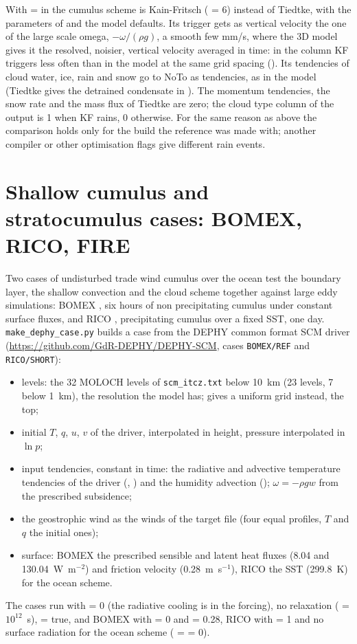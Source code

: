 With  =  in  the
cumulus scheme is Kain-Fritsch ( = 6) instead of Tiedtke, with the parameters
of  and the model defaults. Its trigger gets as
vertical velocity the one of the large scale omega, $-\omega/(\rho g)$,
a smooth few mm/s, where the 3D model gives it the resolved, noisier,
vertical velocity averaged in time: in the column KF triggers less
often than in the model at the same grid spacing (). Its
tendencies of cloud water, ice, rain and snow go to NoTo as tendencies,
as in the model (Tiedtke gives the detrained condensate in
). The momentum tendencies, the snow rate and the mass flux
of Tiedtke are zero; the cloud type column of the output is 1 when KF
rains, 0 otherwise. For the same reason as above
the comparison holds only for the build the reference was made with;
another compiler or other optimisation flags give different rain events.

\section{Shallow cumulus and stratocumulus cases: BOMEX, RICO, FIRE}

Two cases of undisturbed trade wind cumulus over the ocean test the
boundary layer, the shallow convection and the cloud scheme together
against large eddy simulations: BOMEX \citep{siebesma2003}, six hours of
non precipitating cumulus under constant surface fluxes, and RICO
\citep{vanzanten2011}, precipitating cumulus over a fixed SST, one day.
\verb=make_dephy_case.py= builds a case from the DEPHY common format SCM
driver (\url{https://github.com/GdR-DEPHY/DEPHY-SCM}, cases
\verb=BOMEX/REF= and \verb=RICO/SHORT=):
\begin{itemize}
  \item levels: the 32 MOLOCH levels of \verb=scm_itcz.txt= below
        10~km (23 levels, 7 below 1~km), the resolution the model has;
         gives a uniform grid instead,  the top;
  \item initial $T$, $q$, $u$, $v$ of the driver, interpolated in height,
        pressure interpolated in $\ln p$;
  \item input tendencies, constant in time: the radiative and advective
        temperature tendencies of the driver (,
        ) and the humidity advection
        (); $\omega = -\rho g w$ from the prescribed
        subsidence;
  \item the geostrophic wind as the winds of the target file (four equal
        profiles, $T$ and $q$ the initial ones);
  \item surface: BOMEX the prescribed sensible and latent heat fluxes
        (8.04 and 130.04~W~m$^{-2}$) and friction velocity (0.28~m~s$^{-1}$),
        RICO the SST (299.8~K) for the ocean scheme.
\end{itemize}
The cases run with  = 0 (the radiative cooling is in the
forcing), no relaxation ( = $10^{12}$~s),  =
true, and BOMEX with  = 0 and  = 0.28, RICO
with  = 1 and no surface radiation for the ocean scheme
( =  = 0).

